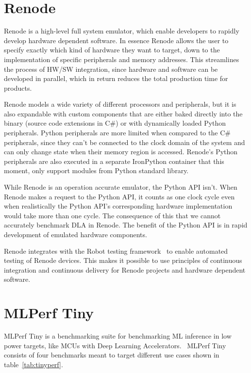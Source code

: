 \documentclass[12pt,a4paper,english
]{tunithesis}
\begin{document}
\section{Renode}
\label{sec:renode}
Renode is a high-level full system emulator, which enable developers to rapidly develop hardware dependent software. In essence Renode allows the user to specify exactly which kind of hardware they want to target, down to the implementation of specific peripherals and memory addresses. This streamlines the process of HW/SW integration, since hardware and software can be developed in parallel, which in return reduces the total production time for products.

Renode models a wide variety of different processors and peripherals, but it is also expandable with custom components that are either baked directly into the binary (source code extensions in C\#) or with dynamically loaded Python peripherals. Python peripherals are more limited when compared to the C\# peripherals, since they can't be connected to the clock domain of the system and can only change state when their memory region is accessed. Renode's Python peripherals are also executed in a separate IronPython container that this moment, only support modules from Python standard library.

While Renode is an operation accurate emulator, the Python API isn't. When Renode makes a request to the Python API, it counts as one clock cycle even when realistically the Python API's corresponding hardware implementation would take more than one cycle. The consequence of this that we cannot accurately benchmark DLA in Renode. The benefit of the Python API is in rapid development of emulated hardware components.

Renode integrates with the Robot testing framework~\cite{robotframework} to enable automated testing of Renode devices. This makes it possible to use principles of continuous integration and continuous delivery for Renode projects and hardware dependent software.

\section{MLPerf Tiny}
\label{sec:tinyperf}
MLPerf Tiny is a benchmarking suite for benchmarking ML inference in low power targets, like MCUs with Deep Learning Accelerators.~\parencite{tinyperf}
MLPerf Tiny consists of four benchmarks meant to target different use cases shown in table~\ref{tab:tinyperf}.
\end{document}
